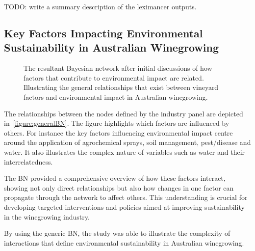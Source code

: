         TODO: write a summary description of the leximancer outputs.

\subsection{Key Factors Impacting Environmental Sustainability in Australian Winegrowing}


\begin{figure}[h!]
    \centering
    \caption{The resultant Bayesian network after initial discussions of how factors that contribute to environmental impact are related. Illustrating the general relationships that exist between vineyard factors and environmental impact in Australian winegrowing.}
    \label{fig:generalBN}
\end{figure}


The relationships between the nodes defined by the industry panel are depicted in~\ref{figure:generalBN}. The figure highlights which factors are influenced by others. For instance the key factors influencing environmental impact centre around the application of agrochemical sprays, soil management, pest/disease and water. It also illustrates the complex nature of variables such as water and their interrelatedness.

The BN provided a comprehensive overview of how these factors interact, showing not only direct relationships but also how changes in one factor can propagate through the network to affect others. This understanding is crucial for developing targeted interventions and policies aimed at improving sustainability in the winegrowing industry.

By using the generic BN, the study was able to illustrate the complexity of interactions that define environmental sustainability in Australian winegrowing.

